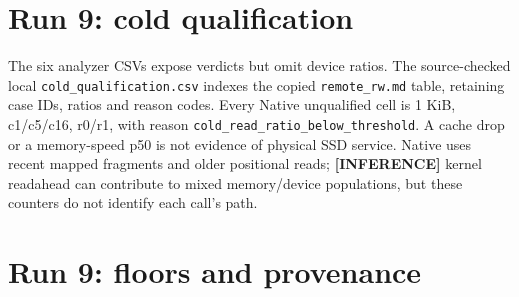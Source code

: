 \clearpage
\section{Run 9: cold qualification}\label{app:rwc-qualification}



The six analyzer CSVs expose verdicts but omit device ratios. The source-checked local \texttt{cold\_qualification.csv} indexes the copied \texttt{remote\_rw.md} table, retaining case IDs, ratios and reason codes. Every Native unqualified cell is 1 KiB, c1/c5/c16, r0/r1, with reason \texttt{cold\_read\_ratio\_below\_threshold}. A cache drop or a memory-speed p50 is not evidence of physical SSD service. Native uses recent mapped fragments and older positional reads; \textbf{[INFERENCE]} kernel readahead can contribute to mixed memory/device populations, but these counters do not identify each call's path.

\clearpage
\section{Run 9: floors and provenance}\label{app:rwc-floors}


\par\smallskip

